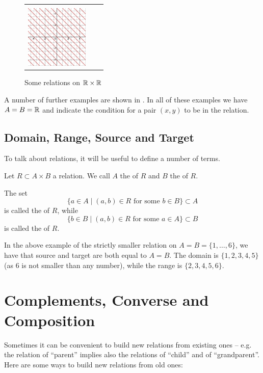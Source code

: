 \begin{figure}[t]
\begin{center}
\begin{tabular}{lll}
\begin{minipage}[t]{3.5cm}
\end{minipage}&\begin{minipage}[t]{3.5cm}
i) $x+y\in\Z$\\
\includegraphics[width=3cm]{pic/relsample9.png}
\end{minipage}\\
\end{tabular}
\end{center}
\caption{Some relations on ${\mathbb R}\times{\mathbb R}$}
\label{figsomeRelations}
\end{figure}

A number of further examples are shown in
. In all of these examples we have $A=B={\mathbb R}$ and
indicate the condition for a pair $(x,y)$ to be in the relation.

\subsection{Domain, Range, Source and Target}

To talk about relations, it will be useful to define a number of terms.
\begin{defn}
Let $R\subset A\times B$ a relation. We call $A$ the  of $R$
and $B$ the  of $R$.

The set
\[
\{a\in A\mid (a,b)\in R\mbox{\ for some $b\in B$}\}\subset A
\]
is called the  of $R$, while
\[
\{b\in B\mid (a,b)\in R\mbox{\ for some $a\in A$}\}\subset B
\]
is called the  of $R$.
\end{defn}

In the above example of the strictly smaller relation on $A=B=\{1,\ldots,6\}$,
we have that source and target are both equal to $A=B$. The domain is
$\{1,2,3,4,5\}$ (as $6$ is not smaller than any number), while the range is
$\{2,3,4,5,6\}$.

\section{Complements, Converse and Composition}

Sometimes it can be convenient to build new relations from existing ones --
e.g. the relation of ``parent'' implies also the relations of ``child'' and
of ``grandparent''. Here are some ways to build new relations from old ones:
\medskip

